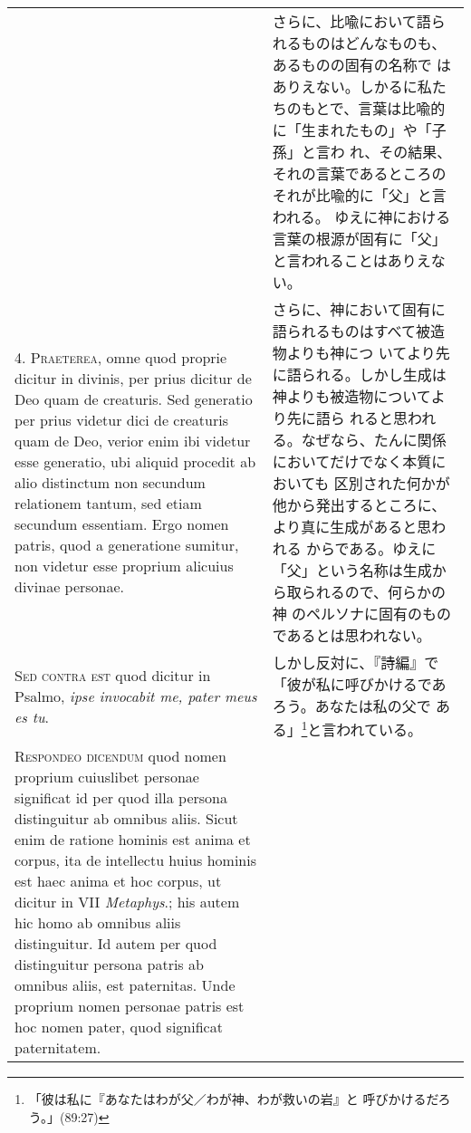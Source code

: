 \documentclass[10pt]{jsarticle} %
\begin{document}
\begin{longtable}{p{21em}p{21em}}
&

さらに、比喩において語られるものはどんなものも、あるものの固有の名称で
 はありえない。しかるに私たちのもとで、言葉は比喩的に「生まれたもの」や「子孫」と言わ
 れ、その結果、それの言葉であるところのそれが比喩的に「父」と言われる。
 ゆえに神における言葉の根源が固有に「父」と言われることはありえない。

\\



4. {\scshape Praeterea}, omne quod proprie dicitur in divinis, per prius dicitur de
Deo quam de creaturis. Sed generatio per prius videtur dici de
creaturis quam de Deo, verior enim ibi videtur esse generatio, ubi
aliquid procedit ab alio distinctum non secundum relationem tantum,
sed etiam secundum essentiam. Ergo nomen patris, quod a generatione
sumitur, non videtur esse proprium alicuius divinae personae.

&

さらに、神において固有に語られるものはすべて被造物よりも神につ
 いてより先に語られる。しかし生成は神よりも被造物についてより先に語ら
 れると思われる。なぜなら、たんに関係においてだけでなく本質においても
 区別された何かが他から発出するところに、より真に生成があると思われる
 からである。ゆえに「父」という名称は生成から取られるので、何らかの神
 のペルソナに固有のものであるとは思われない。

\\



{\scshape Sed contra est} quod dicitur in Psalmo, {\itshape ipse invocabit me, pater meus
es tu}.

&

しかし反対に、『詩編』で「彼が私に呼びかけるであろう。あなたは私の父で
 ある」\footnote{「彼は私に『あなたはわが父／わが神、わが救いの岩』と
 呼びかけるだろう。」(89:27)}と言われている。

\\




{\scshape Respondeo dicendum} quod nomen proprium cuiuslibet personae significat
id per quod illa persona distinguitur ab omnibus aliis. Sicut enim de
ratione hominis est anima et corpus, ita de intellectu huius hominis
est haec anima et hoc corpus, ut dicitur in VII {\itshape Metaphys}.; his autem
hic homo ab omnibus aliis distinguitur. Id autem per quod distinguitur
persona patris ab omnibus aliis, est paternitas. Unde proprium nomen
personae patris est hoc nomen pater, quod significat paternitatem.


\end{longtable}
\end{document}
